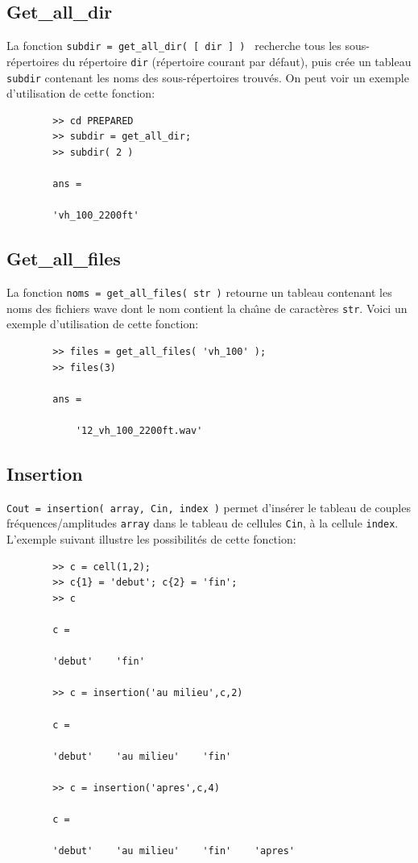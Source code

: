     \bigskip
    \subsection{Get\_all\_dir}
    \label{getalldir}
    La fonction {\tt subdir = get\_all\_dir( [ dir ] ) } recherche
    tous les sous-r{\'e}pertoires du r{\'e}pertoire {\tt dir} (r{\'e}pertoire
    courant par d{\'e}faut), puis cr{\'e}e un tableau {\tt subdir}
    contenant les noms des sous-r{\'e}pertoires trouv{\'e}s. On peut voir
    un exemple d'utilisation de cette fonction:
    \begin{verbatim}
        >> cd PREPARED
        >> subdir = get_all_dir;
        >> subdir( 2 )

        ans =

        'vh_100_2200ft'
    \end{verbatim}


    \bigskip
    \subsection{Get\_all\_files}
    \label{getallfiles}
    La fonction {\tt noms = get\_all\_files( str )} retourne un
    tableau contenant les noms des fichiers wave dont le nom
    contient la cha{\^\i}ne de caract{\`e}res {\tt str}. Voici un exemple
    d'utilisation de cette fonction:
    \begin{verbatim}
        >> files = get_all_files( 'vh_100' );
        >> files(3)

        ans =

            '12_vh_100_2200ft.wav'
    \end{verbatim}


    \bigskip
    \subsection{Insertion}
    \label{insertion}
    {\tt Cout = insertion( array, Cin, index )} permet d'ins{\'e}rer
    le tableau de couples fr{\'e}quences/amplitudes {\tt array} dans
    le tableau de cellules {\tt Cin}, {\`a} la cellule {\tt index}.
    L'exemple suivant illustre les possibilit{\'e}s de cette fonction:

    \begin{verbatim}
        >> c = cell(1,2);
        >> c{1} = 'debut'; c{2} = 'fin';
        >> c

        c =

        'debut'    'fin'

        >> c = insertion('au milieu',c,2)

        c =

        'debut'    'au milieu'    'fin'

        >> c = insertion('apres',c,4)

        c =

        'debut'    'au milieu'    'fin'    'apres'
    \end{verbatim}


